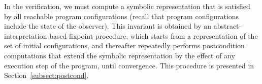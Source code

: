 In the  verification, we must compute a symbolic representation
that is satisfied by all reachable program configurations (recall that
program configurations include the state of the observer).
This invariant is obtained by an abstract-interpretation-based
fixpoint procedure, which starts
from a representation of the set of initial configurations, and
thereafter repeatedly performs
postcondition computations that extend the
symbolic representation by the effect of any execution step of the program,
until convergence.
This procedure is presented in Section~\ref{subsect:postcond}.





